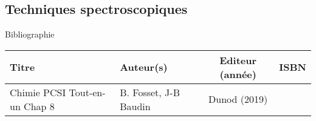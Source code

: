 \begin{headerBlock}
\chapter{Techniques spectroscopiques}
\label{LC_ControleQualite}
 \end{headerBlock}



\begin{reportBlock}{Bibliographie}

\begin{center}
\begin{tabularx}{\textwidth}{| X | X | c | c |}\hline
Titre & Auteur(s) & Editeur (année) & ISBN \\ \hline
Chimie PCSI Tout-en-un Chap 8 & B. Fosset, J-B Baudin & Dunod (2019) &  \\ 
 \hline
 
\end{tabularx}
\end{center}

\end{reportBlock}


